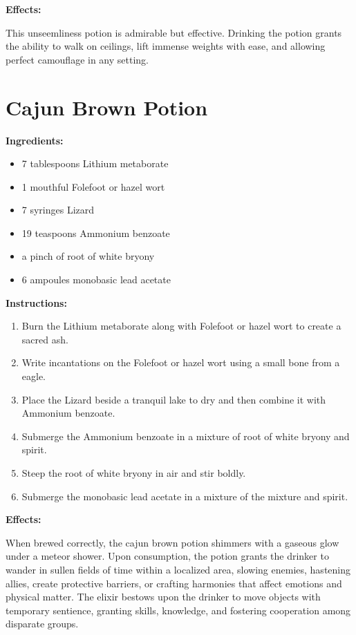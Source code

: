 \documentclass{article}
\begin{document}
\textbf{Effects:}

This unseemliness potion is admirable but effective. Drinking the potion grants the ability to walk on ceilings, lift immense weights with ease, and allowing perfect camouflage in any setting.

\newpage
\section*{Cajun Brown Potion}

\textbf{Ingredients:}

\begin{itemize}
  \item 7 tablespoons Lithium metaborate
  \item 1 mouthful Folefoot or hazel wort
  \item 7 syringes Lizard
  \item 19 teaspoons Ammonium benzoate
  \item a pinch of root of white bryony
  \item 6 ampoules monobasic lead acetate
\end{itemize}

\textbf{Instructions:}

\begin{enumerate}
  \item Burn the Lithium metaborate along with Folefoot or hazel wort to create a sacred ash.
  \item Write incantations on the Folefoot or hazel wort using a small bone from a eagle.
  \item Place the Lizard beside a tranquil lake to dry and then combine it with Ammonium benzoate.
  \item Submerge the Ammonium benzoate in a mixture of root of white bryony and spirit.
  \item Steep the root of white bryony in air and stir boldly.
  \item Submerge the monobasic lead acetate in a mixture of the mixture and spirit.
\end{enumerate}

\textbf{Effects:}

When brewed correctly, the cajun brown potion shimmers with a gaseous glow under a meteor shower. Upon consumption, the potion grants the drinker to wander in sullen fields of time within a localized area, slowing enemies, hastening allies, create protective barriers, or crafting harmonies that affect emotions and physical matter. The elixir bestows upon the drinker to move objects with temporary sentience, granting skills, knowledge, and fostering cooperation among disparate groups.
\end{document}
